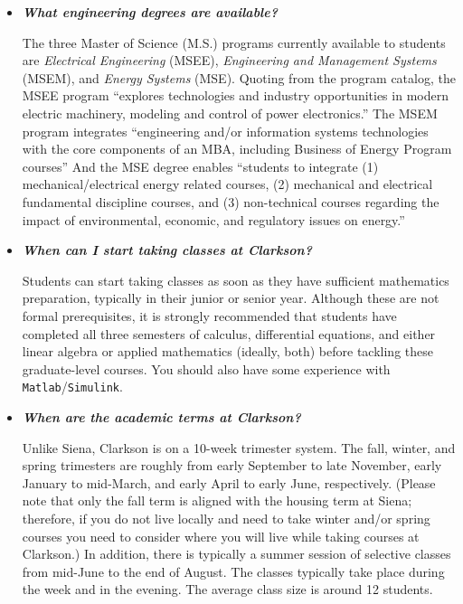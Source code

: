 \documentclass[12pt]{article}
\begin{document}
\begin{itemize}

\item{{\bf {\em What engineering degrees are available?}}

The three Master of Science (M.S.) programs currently available to students are
{\em Electrical Engineering} (MSEE), {\em Engineering and Management Systems}
(MSEM), and {\em Energy Systems} (MSE).  Quoting from the program catalog, the
MSEE program ``explores technologies and industry opportunities in modern
electric machinery, modeling and control of power electronics.''  The MSEM
program integrates ``engineering and/or information systems technologies with
the core components of an MBA, including Business of Energy Program courses''
And the MSE degree enables ``students to integrate (1) mechanical/electrical
energy related courses, (2) mechanical and electrical fundamental discipline
courses, and (3) non-technical courses regarding the impact of environmental,
economic, and regulatory issues on energy.''}

\item{{\bf {\em When can I start taking classes at Clarkson?}}

Students can start taking classes as soon as they have sufficient mathematics
preparation, typically in their junior or senior year.  Although these are not
formal prerequisites, it is strongly recommended that students have completed
all three semesters of calculus, differential equations, and either linear
algebra or applied mathematics (ideally, both) before tackling these
graduate-level courses.  You should also have some experience with {\tt
  Matlab}/{\tt Simulink}.}

\item{{\bf {\em When are the academic terms at Clarkson?}}

Unlike Siena, Clarkson is on a 10-week trimester system.  The fall, winter, and
spring trimesters are roughly from early September to late November, early
January to mid-March, and early April to early June, respectively.  (Please note
that only the fall term is aligned with the housing term at Siena; therefore, if
you do not live locally and need to take winter and/or spring courses you need
to consider where you will live while taking courses at Clarkson.)  In addition,
there is typically a summer session of selective classes from mid-June to the
end of August.  The classes typically take place during the week and in the
evening.  The average class size is around 12 students.}


\end{itemize}
\end{document}

